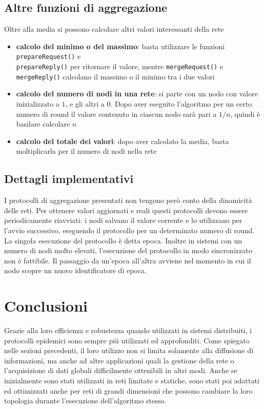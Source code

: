\subsection{Altre funzioni di aggregazione}
Oltre alla media si possono calcolare altri valori interessanti della rete
\begin{itemize}
    \item \textbf{calcolo del minimo o del massimo}: basta utilizzare le funzioni \texttt{prepareRequest()} e \\ \texttt{prepareReply()} per ritornare il valore, mentre \texttt{mergeRequest()} e \texttt{mergeReply()} calcolano il massimo o il minimo tra i due valori
    \item \textbf{calcolo del numero di nodi in una rete}: si parte con un nodo con valore inizializzato a $1$, e gli altri  a $0$. Dopo aver eseguito l'algoritmo per un certo numero di round il valore contenuto in ciascun nodo sarà pari a $1/n$, quindi è basilare calcolare $n$
    \item \textbf{calcolo del totale dei valori}: dopo aver calcolato la media, basta moltiplicarla per il numero di nodi nella rete 
\end{itemize}
\subsection{Dettagli implementativi}
I protocolli di aggregazione presentati non tengono però conto della dinamicità delle reti. Per ottenere valori aggiornati e reali questi protocolli devono essere periodicamente riavviati: i nodi salvano il valore corrente e lo utilizzano per l'avvio successivo, eseguendo il protocollo per un determinato numero di round. La singola esecuzione del protocollo è detta epoca.
Inoltre in sistemi con un numero di nodi molto elevati, l'esecuzione del protocollo in modo sincronizzato non è fattibile. Il passaggio da un'epoca all'altra avviene nel momento in cui il nodo scopre un nuovo identificatore di epoca.
\section{Conclusioni}
Grazie alla loro efficienza e robustezza quando utilizzati in sistemi distribuiti, i protocolli epidemici sono sempre piú utilizzati ed approfonditi. Come spiegato nelle sezioni precedenti, il loro utilizzo non si limita solamente alla diffusione di informazioni, ma anche ad altre applicazioni quali la gestione della rete o l'acquisizione di dati globali difficilmente ottenibili in altri modi. Anche se inizialmente sono stati utilizzati in reti limitate e statiche, sono stati poi adattati ed ottimizzati anche per reti di grandi dimensioni che possono cambiare la loro topologia durante l'esecuzione dell'algoritmo stesso.







